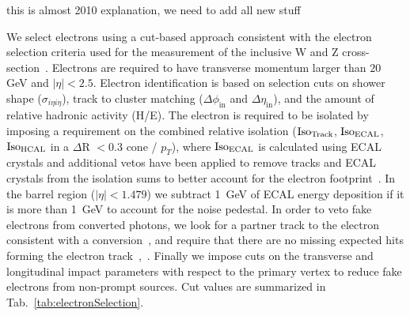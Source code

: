 {\fixme this is almost 2010 explanation, we need to add all new stuff}

We select electrons using a cut-based approach consistent with the electron 
selection criteria used for the measurement of the inclusive W and Z 
cross-section~\cite{VBTFCrossSectionNote}. Electrons are required to 
have transverse momentum larger than $20$ GeV and $|\eta| < 2.5$. Electron 
identification is based on selection cuts on shower shape 
($\sigma_{i\eta i\eta}$), track to cluster matching 
($\Delta \phi_{\mathrm{in}}$ and $\Delta \eta_{\mathrm{in}}$), and the amount 
of relative hadronic activity (H/E). The electron is required to be isolated by 
imposing a requirement on the combined relative isolation 
($\rm{Iso}_{Track}$, $\rm{Iso}_{ECAL}$, $\rm{Iso}_{HCAL}$ in a $\Delta$R $< 0.3$ 
cone / $p_{T}$), where $\rm{Iso}_{ECAL}$ is calculated using ECAL crystals and 
additional vetos have been applied to remove tracks and ECAL crystals from the 
isolation sums to better account for the electron footprint~\cite{ElIso}. In the 
barrel region ($|\eta| < 1.479$) we subtract 1~GeV of 
ECAL energy deposition if it is more than 1~GeV to account for the
noise pedestal. In order to veto fake electrons from converted photons, we look 
for a partner track to the electron consistent with a 
conversion~\cite{ConversionNote}, and require that there are no missing expected 
hits forming the electron track~\cite{ConversionNote},~\cite{NExpHits}. Finally 
we impose cuts on the transverse and longitudinal impact parameters with
respect to the primary vertex to reduce fake electrons from non-prompt
sources. Cut values are summarized in Tab.~\ref{tab:electronSelection}.

